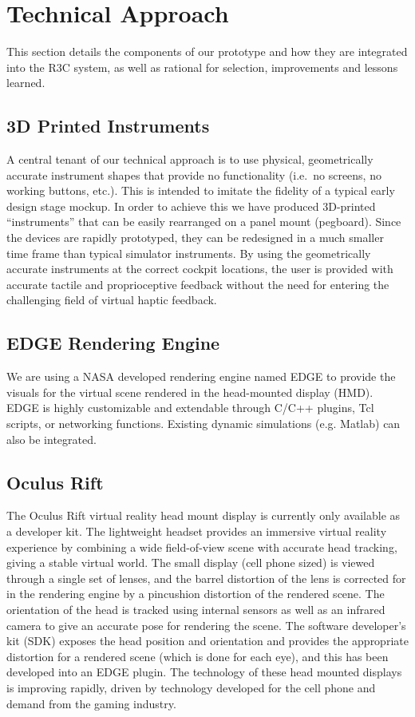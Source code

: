 \section{Technical Approach}

This section details the components of our prototype and how they are integrated into the R3C system, as well as rational for selection, improvements and lessons learned.

\subsection{3D Printed Instruments}

A central tenant of our technical approach is to use physical, geometrically accurate instrument shapes that provide no functionality (i.e.\ no screens, no working buttons, etc.).
This is intended to imitate the fidelity of a typical early design stage mockup.
In order to achieve this we have produced 3D-printed ``instruments'' that can be easily rearranged on a panel mount (pegboard).
Since the devices are rapidly prototyped, they can be redesigned in a much smaller time frame than typical simulator instruments.
By using the geometrically accurate instruments at the correct cockpit locations, the user is provided with accurate tactile and proprioceptive feedback without the need for entering the challenging field of virtual haptic feedback.

\subsection{EDGE Rendering Engine}

We are using a NASA developed rendering engine named EDGE to provide the visuals for the virtual scene rendered in the head-mounted display (HMD).
EDGE is highly customizable and extendable through C/C++ plugins, Tcl scripts, or networking functions.
Existing dynamic simulations (e.g. Matlab) can also be integrated.

\subsection{Oculus Rift}

The Oculus Rift virtual reality head mount display is currently only available as a developer kit.
The lightweight headset provides an immersive virtual reality experience by combining a wide field-of-view scene with accurate head tracking, giving a stable virtual world.
The small display (cell phone sized) is viewed through a single set of lenses, and the barrel distortion of the lens is corrected for in the rendering engine by a pincushion distortion of the rendered scene.
The orientation of the head is tracked using internal sensors as well as an infrared camera to give an accurate pose for rendering the scene.
The software developer’s kit (SDK) exposes the head position and orientation and provides the appropriate distortion for a rendered scene (which is done for each eye), and this has been developed into an EDGE plugin.
The technology of these head mounted displays is improving rapidly, driven by technology developed for the cell phone and demand from the gaming industry.

